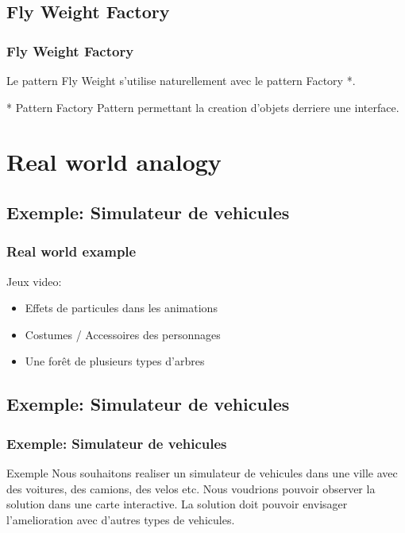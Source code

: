 \documentclass{beamer}
\begin{document}

\subsection{Fly Weight Factory}
\begin{frame}
\frametitle{Fly Weight Factory}
Le pattern Fly Weight s'utilise naturellement avec le pattern Factory *.

\begin{block}{* Pattern Factory}
Pattern permettant la creation d'objets derriere une interface.
\end{block}

\end{frame}

\section{Real world analogy}

\subsection{Exemple: Simulateur de vehicules}

\begin{frame}
\frametitle{Real world example}

Jeux video:
\begin{itemize}
\item Effets de particules dans les animations
\item Costumes / Accessoires des personnages
\item Une forêt de plusieurs types d'arbres
\end{itemize}
\end{frame}


\subsection{Exemple: Simulateur de vehicules}
\begin{frame}
\frametitle{Exemple: Simulateur de vehicules}
\begin{block}{Exemple}
Nous souhaitons realiser un simulateur de vehicules dans une ville avec des voitures, des camions, des velos etc.
Nous voudrions pouvoir observer la solution dans une carte interactive.
La solution doit pouvoir envisager l'amelioration avec d'autres types de vehicules.
\end{block}
\end{frame}
\end{document}
